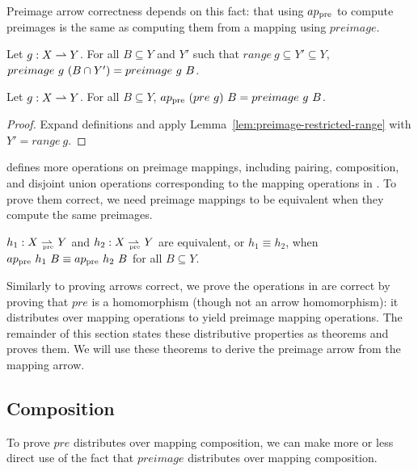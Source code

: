 Preimage arrow correctness depends on this fact: that using $ap_\mathrm{pre}$ to compute preimages is the same as computing them from a mapping using $preimage$.

\begin{lemma}
\label{lem:preimage-restricted-range}
Let $g : X \rightharpoonup Y$.
For all $B \subseteq Y$ and $Y'$ such that $range~g \subseteq Y' \subseteq Y$, $preimage~g~(B \cap Y') = preimage~g~B$.%
\end{lemma}

\begin{theorem}
\label{thm:pre-like-preimage}
Let $g : X \rightharpoonup Y$. For all $B \subseteq Y$, $ap_\mathrm{pre}~(pre~g)~B = preimage~g~B$.%
\end{theorem}
\begin{proof}
Expand definitions and apply Lemma~\ref{lem:preimage-restricted-range} with $Y' = range~g$.
\end{proof}

 defines more operations on preimage mappings, including pairing, composition, and disjoint union operations corresponding to the mapping operations in .
To prove them correct, we need preimage mappings to be equivalent when they compute the same preimages.

\begin{definition}
$h_1 : X \rightharpoonup_{\mspace{-19mu}_\mathrm{pre}} Y$ and $h_2 : X \rightharpoonup_{\mspace{-19mu}_\mathrm{pre}} Y$ are equivalent, or $h_1 \equiv h_2$, when $ap_\mathrm{pre}~h_1~B \equiv ap_\mathrm{pre}~h_2~B$ for all $B \subseteq Y$.
\end{definition}

Similarly to proving arrows correct, we prove the operations in  are correct by proving that $pre$ is a homomorphism (though not an arrow homomorphism): it distributes over mapping operations to yield preimage mapping operations.
The remainder of this section states these distributive properties as theorems and proves them.
We will use these theorems to derive the preimage arrow from the mapping arrow.

\subsection{Composition}

To prove $pre$ distributes over mapping composition, we can make more or less direct use of the fact that $preimage$ distributes over mapping composition.

